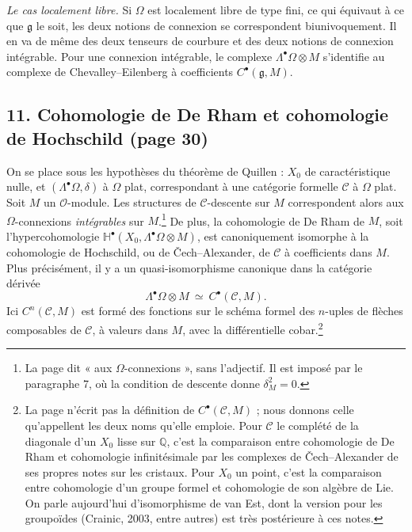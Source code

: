\documentclass[11pt,a4paper]{article}
\begin{document}
\emph{Le cas localement libre.} Si $\Omega$ est localement libre de type fini,
ce qui équivaut à ce que $\mathfrak{g}$ le soit, les deux notions de connexion
se correspondent biunivoquement. Il en va de même des deux tenseurs de courbure
et des deux notions de connexion intégrable. Pour une connexion intégrable, le
complexe $\Lambda^{\bullet}\Omega \otimes M$ s'identifie au complexe de
Chevalley--Eilenberg à coefficients $C^{\bullet}(\mathfrak{g}, M)$.

\subsection*{11. Cohomologie de De Rham et cohomologie de Hochschild (page 30)}

On se place sous les hypothèses du théorème de Quillen : $X_0$ de
caractéristique nulle, et $(\Lambda^{\bullet}\Omega, \delta)$ à $\Omega$ plat,
correspondant à une catégorie formelle $\mathcal{C}$ à $\Omega$ plat. Soit $M$
un $\mathcal{O}$-module. Les structures de $\mathcal{C}$-descente sur $M$
correspondent alors aux $\Omega$-connexions \emph{intégrables} sur
$M$.\footnote{La page dit « aux $\Omega$-connexions », sans l'adjectif. Il est
imposé par le paragraphe 7, où la condition de descente donne $\delta_M^{2} =
0$.} De plus, la cohomologie de De Rham de $M$, soit l'hypercohomologie
$\mathbb{H}^{\bullet}(X_0, \Lambda^{\bullet}\Omega \otimes M)$, est
canoniquement isomorphe à la cohomologie de Hochschild, ou de Čech--Alexander,
de $\mathcal{C}$ à coefficients dans $M$. Plus précisément, il y a un
quasi-isomorphisme canonique dans la catégorie dérivée
\[
\Lambda^{\bullet}\Omega \otimes M \ \simeq\ C^{\bullet}(\mathcal{C}, M).
\]
Ici $C^{n}(\mathcal{C}, M)$ est formé des fonctions sur le schéma formel des
$n$-uples de flèches composables de $\mathcal{C}$, à valeurs dans $M$, avec la
différentielle cobar.\footnote{La page n'écrit pas la définition de
$C^{\bullet}(\mathcal{C}, M)$ ; nous donnons celle qu'appellent les deux noms
qu'elle emploie. Pour $\mathcal{C}$ le complété de la diagonale d'un
$X_0$ lisse sur $\mathbb{Q}$, c'est la comparaison entre cohomologie de De Rham
et cohomologie infinitésimale par les complexes de Čech--Alexander de ses
propres notes sur les cristaux. Pour $X_0$ un point, c'est la comparaison
entre cohomologie d'un groupe formel et cohomologie de son algèbre de Lie. On
parle aujourd'hui d'isomorphisme de van Est, dont la version pour les
groupoïdes (Crainic, 2003, entre autres) est très postérieure à ces notes.}
\end{document}
